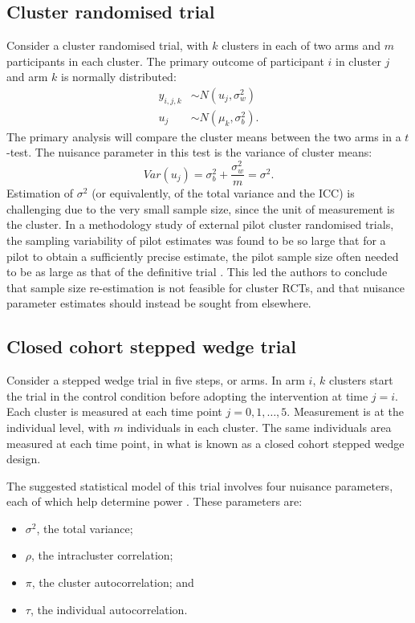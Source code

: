 \documentclass[sagev, Crown]{sagej}
\begin{document}
\subsection{Cluster randomised trial}\label{sec:ex_cRCT}

Consider a cluster randomised trial, with $k$ clusters in each of two arms and $m$ participants in each cluster. The primary outcome of participant $i$ in cluster $j$ and arm $k$ is normally distributed:
\begin{align*}
y_{i,j,k} & \sim N(u_j, \sigma_w^2) \\
u_j & \sim N(\mu_k, \sigma_b^2).
\end{align*}
The primary analysis will compare the cluster means between the two arms in a $t$-test. The nuisance parameter in this test is the variance of cluster means:
$$
Var(u_j) = \sigma_b^2 + \frac{\sigma_w^2}{m} = \sigma^2.
$$
Estimation of $\sigma^2$ (or equivalently, of the total variance and the ICC) is challenging due to the very small sample size, since the unit of measurement is the cluster. In a methodology study of external pilot cluster randomised trials, the sampling variability of pilot estimates was found to be so large that for a pilot to obtain a sufficiently precise estimate, the pilot sample size often needed to be as large as that of the definitive trial \cite{Eldridge2015}. This led the authors to conclude that sample size re-estimation is not feasible for cluster RCTs, and that nuisance parameter estimates should instead be sought from elsewhere.


\subsection{Closed cohort stepped wedge trial}\label{sec:ex_SW}

Consider a stepped wedge trial in five steps, or arms. In arm $i$, $k$ clusters start the trial in the control condition before adopting the intervention at time $j = i$. Each cluster is measured at each time point $j = 0, 1, \ldots , 5$. Measurement is at the individual level, with $m$ individuals in each cluster. The same individuals area measured at each time point, in what is known as a closed cohort stepped wedge design.

The suggested statistical model of this trial involves four nuisance parameters, each of which help determine power \cite{Hooper2016}. These parameters are:
\begin{itemize}
\item $\sigma^2$, the total variance;
\item $\rho$, the intracluster correlation;
\item $\pi$, the cluster autocorrelation; and
\item $\tau$, the individual autocorrelation.
\end{itemize}
\end{document}
